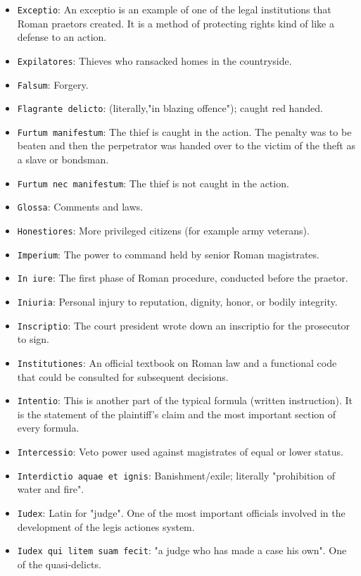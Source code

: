 \documentclass[11pt]{article}
\begin{document}
\begin{itemize}
\item \texttt{Exceptio}: An exceptio is an example of one of the legal institutions that Roman praetors created. It is a method of protecting rights kind of like a defense to an action.
\item \texttt{Expilatores}: Thieves who ransacked homes in the countryside.
\item \texttt{Falsum}: Forgery.
\item \texttt{Flagrante delicto}: (literally,"in blazing offence"); caught red handed.
\item \texttt{Furtum manifestum}: The thief is caught in the action. The penalty was to be beaten and then the perpetrator was handed over to the victim of the theft as a slave or bondsman.
\item \texttt{Furtum nec manifestum}: The thief is not caught in the action.
\item \texttt{Glossa}: Comments and laws.
\item \texttt{Honestiores}: More privileged citizens (for example army veterans).
\item \texttt{Imperium}: The power to command held by senior Roman magistrates.
\item \texttt{In iure}: The first phase of Roman procedure, conducted before the praetor.
\item \texttt{Iniuria}: Personal injury to reputation, dignity, honor, or bodily integrity.
\item \texttt{Inscriptio}: The court president wrote down an inscriptio for the prosecutor to sign.
\item \texttt{Institutiones}: An official textbook on Roman law and a functional code that could be consulted for subsequent decisions.
\item \texttt{Intentio}: This is another part of the typical formula (written instruction). It is the statement of the plaintiff's claim and the most important section of every formula.
\item \texttt{Intercessio}: Veto power used against magistrates of equal or lower status.
\item \texttt{Interdictio aquae et ignis}: Banishment/exile; literally "prohibition of water and fire".
\item \texttt{Iudex}: Latin for "judge". One of the most important officials involved in the development of the legis actiones system.
\item \texttt{Iudex qui litem suam fecit}: "a judge who has made a case his own". One of the quasi-delicts.

\end{itemize}
\end{document}
